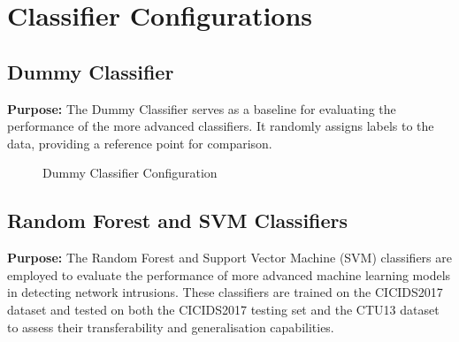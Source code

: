 \section{Classifier Configurations}\label{sec:ClassifierConfigurations}

\subsection{Dummy Classifier}\label{subsec:DummyClassifier}

\textbf{Purpose:} The Dummy Classifier serves as a baseline for evaluating the performance of the more advanced classifiers. It randomly assigns labels to the data, providing a reference point for comparison.

\begin{figure}[H]
    \centering
    \caption{Dummy Classifier Configuration}\label{fig:DummyClassifierConfig}
\end{figure}

\subsection{Random Forest and SVM Classifiers}\label{subsec:RandomForest+SVMClassifier}

\textbf{Purpose:} The Random Forest and Support Vector Machine (SVM) classifiers are employed to evaluate the performance of more advanced machine learning models in detecting network intrusions. These classifiers are trained on the CICIDS2017 dataset and tested on both the CICIDS2017 testing set and the CTU13 dataset to assess their transferability and generalisation capabilities.

